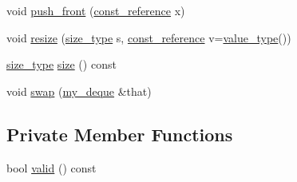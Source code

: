 \begin{DoxyCompactItemize}
\item 
void \hyperlink{classmy__deque_ab8157d97525b26ec62364372ccc16a31}{push\-\_\-front} (\hyperlink{classmy__deque_ad50d8b378580088cf77fa43f0640e49c}{const\-\_\-reference} x)
\item 
void \hyperlink{classmy__deque_a80369f549dcd0a2ea9bc086fc97c8e25}{resize} (\hyperlink{classmy__deque_a61e5e5317fe72a381ce4d45f09544b02}{size\-\_\-type} s, \hyperlink{classmy__deque_ad50d8b378580088cf77fa43f0640e49c}{const\-\_\-reference} v=\hyperlink{classmy__deque_ae9c156c405acc57623a4601ce755596f}{value\-\_\-type}())
\item 
\hyperlink{classmy__deque_a61e5e5317fe72a381ce4d45f09544b02}{size\-\_\-type} \hyperlink{classmy__deque_a3100498f22d2dfa480b141f8ef7990ca}{size} () const 
\item 
void \hyperlink{classmy__deque_a50f83432394d6d068d4d96a3515d7b79}{swap} (\hyperlink{classmy__deque}{my\-\_\-deque} \&that)
\end{DoxyCompactItemize}
\subsection*{Private Member Functions}
\begin{DoxyCompactItemize}
\item 
bool \hyperlink{classmy__deque_ac48856ffa58fe0d4d21852c503d7ff73}{valid} () const 
\end{DoxyCompactItemize}
